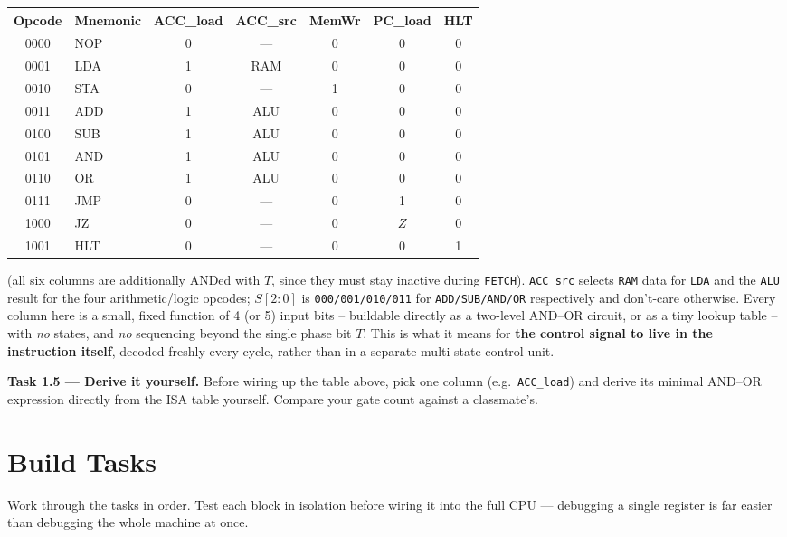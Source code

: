 \documentclass[11pt,a4paper]{article}
\newcommand{\task}[1]{\par\vspace{4pt}\noindent\textbf{Task #1}}
\begin{document}
\begin{center}
\begin{tabular}{@{}clccccc@{}}
\toprule
\textbf{Opcode} & \textbf{Mnemonic} & \textbf{ACC\_load} & \textbf{ACC\_src} & \textbf{MemWr} & \textbf{PC\_load} & \textbf{HLT} \\
\midrule
0000 & NOP & 0 & --- & 0 & 0 & 0 \\
0001 & LDA & 1 & RAM  & 0 & 0 & 0 \\
0010 & STA & 0 & ---  & 1 & 0 & 0 \\
0011 & ADD & 1 & ALU  & 0 & 0 & 0 \\
0100 & SUB & 1 & ALU  & 0 & 0 & 0 \\
0101 & AND & 1 & ALU  & 0 & 0 & 0 \\
0110 & OR  & 1 & ALU  & 0 & 0 & 0 \\
0111 & JMP & 0 & ---  & 0 & 1 & 0 \\
1000 & JZ  & 0 & ---  & 0 & $Z$ & 0 \\
1001 & HLT & 0 & ---  & 0 & 0 & 1 \\
\bottomrule
\end{tabular}
\end{center}

(all six columns are additionally ANDed with $T$, since they must stay
inactive during \texttt{FETCH}). \texttt{ACC\_src} selects \texttt{RAM}
data for \texttt{LDA} and the \texttt{ALU} result for the four
arithmetic/logic opcodes; $S[2{:}0]$ is \texttt{000/001/010/011} for
\texttt{ADD/SUB/AND/OR} respectively and don't-care otherwise. Every
column here is a small, fixed function of 4 (or 5) input bits -- buildable
directly as a two-level AND--OR circuit, or as a tiny lookup table -- with
\emph{no} states, and \emph{no} sequencing beyond the single phase bit
$T$. This is what it means for \textbf{the control signal to live in the
instruction itself}, decoded freshly every cycle, rather than in a
separate multi-state control unit.

\task{1.5 --- Derive it yourself.} Before wiring up the table above, pick
one column (e.g.\ \texttt{ACC\_load}) and derive its minimal AND--OR
expression directly from the ISA table yourself. Compare your gate count
against a classmate's.

\section{Build Tasks}

Work through the tasks in order. Test each block in isolation before
wiring it into the full CPU --- debugging a single register is far easier
than debugging the whole machine at once.
\end{document}

